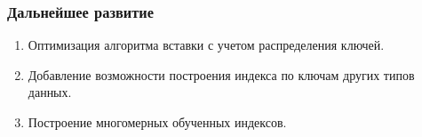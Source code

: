 \documentclass[8pt]{bmstu-pr}
\begin{document}
\begin{frame}
    \fontsize{22pt}{22pt}\selectfont
    \frametitle{Дальнейшее развитие}
    \begin{enumerate}
        \item Оптимизация алгоритма вставки с учетом распределения ключей.
        \item Добавление возможности построения индекса по ключам других типов
            данных.
        \item  Построение многомерных обученных индексов.
    \end{enumerate}
    ~\\
\end{frame}
\end{document}
